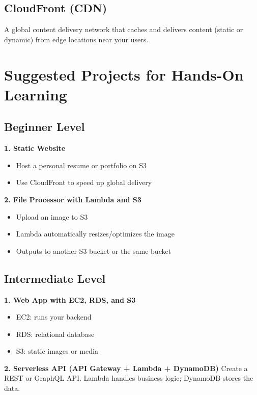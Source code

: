 \documentclass[11pt]{article}
\begin{document}
\subsection{CloudFront (CDN)}
A global content delivery network that caches and delivers content (static or dynamic) from edge locations near your users.

\clearpage

\section{Suggested Projects for Hands-On Learning}

\subsection{Beginner Level}
\textbf{1. Static Website}
\begin{itemize}
    \item Host a personal resume or portfolio on S3
    \item Use CloudFront to speed up global delivery
\end{itemize}

\textbf{2. File Processor with Lambda and S3}
\begin{itemize}
    \item Upload an image to S3
    \item Lambda automatically resizes/optimizes the image
    \item Outputs to another S3 bucket or the same bucket
\end{itemize}

\subsection{Intermediate Level}
\textbf{1. Web App with EC2, RDS, and S3}
\begin{itemize}
    \item EC2: runs your backend
    \item RDS: relational database
    \item S3: static images or media
\end{itemize}

\textbf{2. Serverless API (API Gateway + Lambda + DynamoDB)}
Create a REST or GraphQL API. Lambda handles business logic; DynamoDB stores the data.
\end{document}
